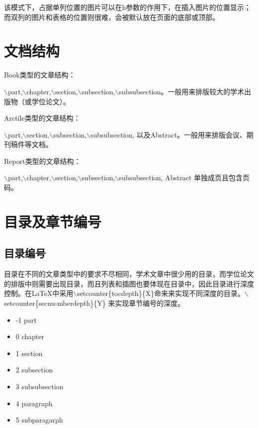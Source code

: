 \documentclass[12pt]{book}
\begin{document}
该模式下，占据单列位置的图片可以在h参数的作用下，在插入图片的位置显示；而双列的图片和表格的位置则很难，会被默认放在页面的底部或顶部。
    
\section{文档结构}


Book类型的文章结构：

$\backslash$part,$\backslash$chapter,$\backslash$section,$\backslash$subsection,$\backslash$subsubsection。一般用来排版较大的学术出版物（或学位论文）。

Arctile类型的文章结构：

$\backslash$part,$\backslash$section,$\backslash$subsection,$\backslash$subsubsection, 以及Abstract。一般用来排版会议、期刊稿件等文档。

Report类型的文章结构：

$\backslash$part,$\backslash$chapter,$\backslash$section,$\backslash$subsection,$\backslash$subsubsection, Abstract 单独成页且包含页码。

\section{目录及章节编号}
    
\subsection{目录编号}
    
目录在不同的文章类型中的要求不尽相同，学术文章中很少用的目录，而学位论文的排版中则需要出现目录，而且列表和插图也要体现在目录中，因此目录进行深度控制。在\LaTeX{}中采用$\backslash$setcounter\{tocdepth\}\{X\}命来来实现不同深度的目录。$\backslash$setcounter\{secnu-mberdepth\}\{Y\} 来实现章节编号的深度。
    
    \begin{center}
        \begin{itemize}
            \item -1 part                    
            \item  0 chapter               
            \item  1 section                
            \item  2 subsection          
            \item  3 subsubsection     
            \item  4 paragraph            
            \item  5 subparagarph   
        \end{itemize}
    \end{center}
    
\end{document}
